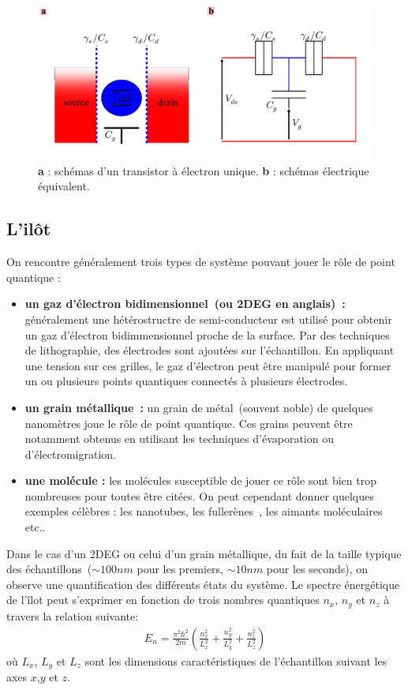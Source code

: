 \begin{figure}
\includegraphics[scale=0.45]{Annexe2/figure1/figure1.pdf} 
\caption{\textbf{a} : schémas d'un transistor à électron unique. \textbf{b} : schémas électrique équivalent.}
\label{description_systeme}
\end{figure}



\subsection{L'il\^ot}
On rencontre généralement trois types de système pouvant jouer le rôle de point quantique :
\begin{itemize}
\item \textbf{un gaz d'électron bidimensionnel~(ou 2DEG en anglais)~\cite{Gordon1}:} généralement une hétérostructre de semi-conducteur est utilisé pour obtenir un gaz d'électron bidimmensionnel proche de la surface. Par des techniques de lithographie, des électrodes sont ajoutées sur l'échantillon. En appliquant une tension sur ces grilles, le gaz d'électron peut \^etre manipulé pour former un ou plusieurs points quantiques connectés à plusieurs électrodes.
\item \textbf{un grain métallique~\cite{Deshmukh2002}:} un grain de métal~(souvent noble) de quelques nanomètres joue le rôle de point quantique. Ces grains peuvent \^etre notamment obtenus en utilisant les techniques d'évaporation ou d'électromigration.
\item \textbf{une molécule \cite{Reed1,Park1}:} les molécules susceptible de jouer ce r\^ole sont bien trop nombreuses pour toutes \^etre citées. On peut cependant donner quelques exemples célèbres : les nanotubes, les fullerènes~\cite{Park1}, les aimants moléculaires~\cite{Heersche2006} etc.. \newline
\end{itemize}

Dans le cas d'un 2DEG ou celui d'un grain métallique, du fait de la taille typique des échantillons~($\sim 100nm$ pour les premiers, $\sim 10nm$ pour les seconds), on observe une quantification des différents états du système. Le spectre énergétique de l'\^ilot peut s'exprimer en fonction de trois nombres quantiques $n_x$, $n_y$ et $n_z$ à travers la relation suivante:
\begin{eqnarray}
E_n = \frac{\pi^2 \hbar^2}{2m}(\frac{n_x^2}{L_x^2} + \frac{n_y^2}{L_y^2} + \frac{n_z^2}{L_z^2}) \nonumber
\end{eqnarray}
où $L_x$, $L_y$ et $L_z$ sont les dimensions caractéristiques de l'échantillon suivant les axes $x$,$y$ et $z$.

